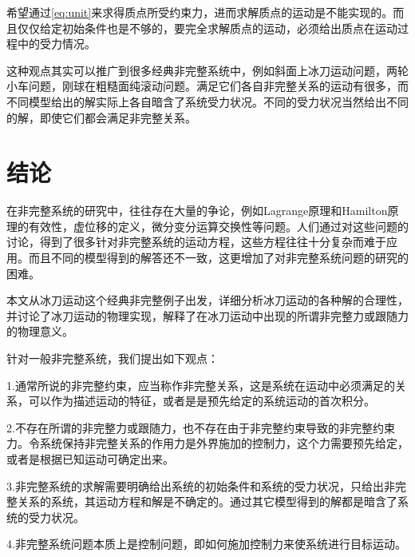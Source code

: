 \documentclass{ctexart}
\begin{document}
希望通过\eqref{eq:unit}来求得质点所受约束力，进而求解质点的运动是不能实现的。而且仅仅给定初始条件也是不够的，要完全求解质点的运动，必须给出质点在运动过程中的受力情况。


这种观点其实可以推广到很多经典非完整系统中，例如斜面上冰刀运动问题，两轮小车问题，刚球在粗糙面纯滚动问题。满足它们各自非完整关系的运动有很多，而不同模型给出的解实际上各自暗含了系统受力状况。不同的受力状况当然给出不同的解，即使它们都会满足非完整关系。


\section{结论}
\label{sec:conclusion}

在非完整系统的研究中，往往存在大量的争论，例如Lagrange原理和Hamilton原理的有效性，虚位移的定义，微分变分运算交换性等问题。人们通过对这些问题的讨论，得到了很多针对非完整系统的运动方程，这些方程往往十分复杂而难于应用。而且不同的模型得到的解答还不一致，这更增加了对非完整系统问题的研究的困难。

本文从冰刀运动这个经典非完整例子出发，详细分析冰刀运动的各种解的合理性，并讨论了冰刀运动的物理实现，解释了在冰刀运动中出现的所谓非完整力或跟随力的物理意义。

针对一般非完整系统，我们提出如下观点：

1.通常所说的非完整约束，应当称作非完整关系，这是系统在运动中必须满足的关系，可以作为描述运动的特征，或者是是预先给定的系统运动的首次积分。

2.不存在所谓的非完整力或跟随力，也不存在由于非完整约束导致的非完整约束力。令系统保持非完整关系的作用力是外界施加的控制力，这个力需要预先给定，或者是根据已知运动可确定出来。

3.非完整系统的求解需要明确给出系统的初始条件和系统的受力状况，只给出非完整关系的系统，其运动方程和解是不确定的。通过其它模型得到的解都是暗含了系统的受力状况。

4.非完整系统问题本质上是控制问题，即如何施加控制力来使系统进行目标运动。
\end{document}
